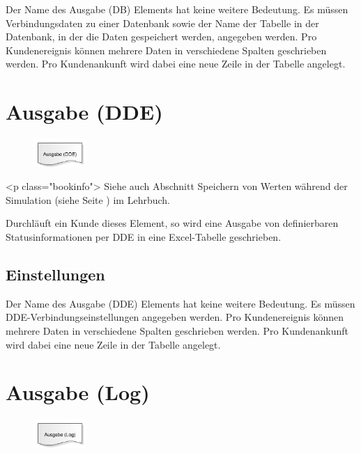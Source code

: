 Der Name des Ausgabe (DB) Elements hat keine weitere Bedeutung. Es müssen Verbindungsdaten zu einer
Datenbank sowie der Name der Tabelle in der Datenbank, in der die Daten gespeichert werden, angegeben werden.
Pro Kundenereignis können mehrere Daten in verschiedene Spalten geschrieben werden. Pro Kundenankunft
wird dabei eine neue Zeile in der Tabelle angelegt.


\section{Ausgabe (DDE)}
\label{ref:ModelElementOutputDDE}

\begin{figure}
\vspace{-22pt}
\includegraphics[width=2cm]{imageModelElementOutputDDE.png}
\vspace{-22pt}
\end{figure}

<p class="bookinfo">
Siehe auch Abschnitt Speichern von Werten während der Simulation (siehe Seite \pageref{ref:book:9.3.3}) im Lehrbuch.

Durchläuft ein Kunde dieses Element, so wird eine Ausgabe von definierbaren Statusinformationen per
DDE in eine Excel-Tabelle geschrieben.

\subsection*{Einstellungen}

Der Name des Ausgabe (DDE) Elements hat keine weitere Bedeutung. Es müssen DDE-Verbindungseinstellungen
angegeben werden.
Pro Kundenereignis können mehrere Daten in verschiedene Spalten geschrieben werden. Pro Kundenankunft
wird dabei eine neue Zeile in der Tabelle angelegt.


\section{Ausgabe (Log)}
\label{ref:ModelElementOutputLog}

\begin{figure}
\vspace{-22pt}
\includegraphics[width=2cm]{imageModelElementOutputLog.png}
\vspace{-22pt}
\end{figure}

